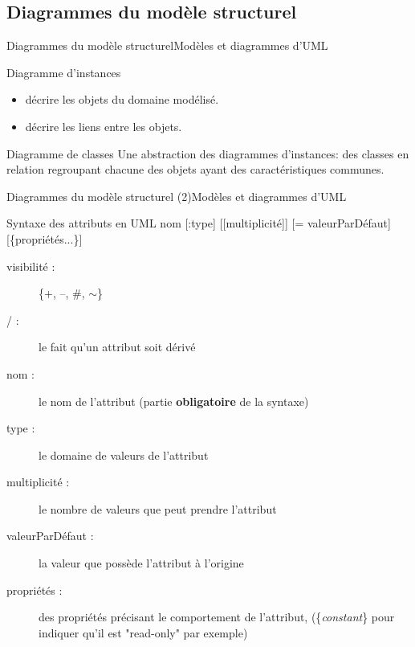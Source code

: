 \documentclass{beamer}
\begin{document}
  \subsection{Diagrammes du modèle structurel}
    \begin{frame}{Diagrammes du modèle structurel}{Modèles et diagrammes d'UML}
      \begin{block}{Diagramme d'instances}
        \begin{itemize}
          \item{décrire les objets du domaine modélisé.}
          \item{décrire les liens entre les objets.}
        \end{itemize}
      \end{block}
      \pause
      \begin{block}{Diagramme de classes}
        Une abstraction des diagrammes d'instances: des classes en relation regroupant chacune des objets ayant des caractéristiques communes.
      \end{block}
    \end{frame}

    \begin{frame}{Diagrammes du modèle structurel (2)}{Modèles et diagrammes d'UML}
      \begin{block}{Syntaxe des attributs en UML}
        \og [visibilité] [/] nom [:type] [[multiplicité]] [= valeurParDéfaut] [\{propriétés...\}] \fg{}
        \begin{description}
          \item[visibilité :]{\{+, --, \#, $\sim$\}}
          \item[/ :]{le fait qu'un attribut soit dérivé}
          \item[nom :]{le nom de l'attribut (partie \textbf{obligatoire} de la syntaxe)}
          \item[type :]{le domaine de valeurs de l'attribut}
          \item[multiplicité :]{le nombre de valeurs que peut prendre l'attribut}
          \item[valeurParDéfaut :]{la valeur que possède l'attribut à l'origine}
          \item[propriétés :]{des propriétés précisant le comportement de l'attribut, (\{\textit{constant}\} pour indiquer qu'il est "read-only" par exemple)}
        \end{description}
      \end{block}
    \end{frame}
\end{document}

